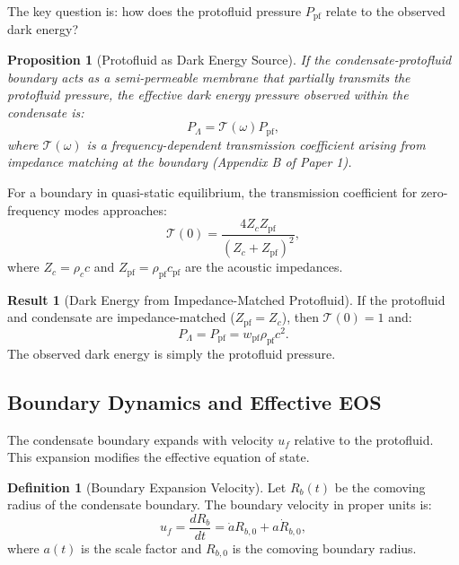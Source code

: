 \documentclass[11pt,a4paper]{article}
\newcommand{\wpf}{\ensuremath{w_{\mathrm{pf}}}}
\newcommand{\Ppf}{\ensuremath{P_{\mathrm{pf}}}}
\newcommand{\rhopf}{\ensuremath{\rho_{\mathrm{pf}}}}
\newtheorem{proposition}[theorem]{Proposition}
\theoremstyle{definition}
\newtheorem{definition}[theorem]{Definition}
\newtheorem{result}{Result}
\theoremstyle{remark}
\begin{document}
The key question is: how does the protofluid pressure $\Ppf$ relate to the observed dark energy?

\begin{proposition}[Protofluid as Dark Energy Source]
\label{prop:protofluid_dark_energy}
If the condensate-protofluid boundary acts as a semi-permeable membrane that partially transmits the protofluid pressure, the effective dark energy pressure observed within the condensate is:
\begin{equation}
\label{eq:P_Lambda_from_pf}
P_\Lambda = \mathcal{T}(\omega) \Ppf,
\end{equation}
where $\mathcal{T}(\omega)$ is a frequency-dependent transmission coefficient arising from impedance matching at the boundary (Appendix B of Paper 1).
\end{proposition}

For a boundary in quasi-static equilibrium, the transmission coefficient for zero-frequency modes approaches:
\begin{equation}
\mathcal{T}(0) = \frac{4 Z_c Z_{\mathrm{pf}}}{(Z_c + Z_{\mathrm{pf}})^2},
\end{equation}
where $Z_c = \rho_c c$ and $Z_{\mathrm{pf}} = \rhopf c_{\mathrm{pf}}$ are the acoustic impedances.

\begin{result}[Dark Energy from Impedance-Matched Protofluid]
\label{result:dark_energy_impedance}
If the protofluid and condensate are impedance-matched ($Z_{\mathrm{pf}} = Z_c$), then $\mathcal{T}(0) = 1$ and:
\begin{equation}
\boxed{P_\Lambda = \Ppf = \wpf \rhopf c^2.}
\end{equation}
The observed dark energy is simply the protofluid pressure.
\end{result}

\subsection{Boundary Dynamics and Effective EOS}
\label{sec:boundary_eos}

The condensate boundary expands with velocity $u_f$ relative to the protofluid. This expansion modifies the effective equation of state.

\begin{definition}[Boundary Expansion Velocity]
\label{def:boundary_velocity}
Let $R_b(t)$ be the comoving radius of the condensate boundary. The boundary velocity in proper units is:
\begin{equation}
u_f = \frac{dR_b}{dt} = \dot{a} R_{b,0} + a \dot{R}_{b,0},
\end{equation}
where $a(t)$ is the scale factor and $R_{b,0}$ is the comoving boundary radius.
\end{definition}
\end{document}
